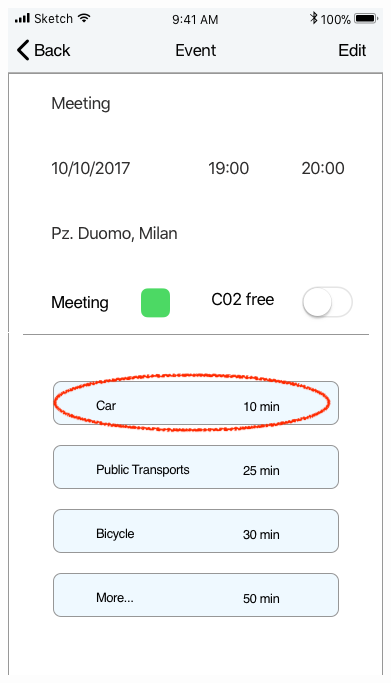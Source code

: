 \begin{figure}[H]
	\includegraphics[scale=0.23]{Images/Interface/Directions/2_single_event_view}
	\hspace{0.5cm}

\end{figure}
